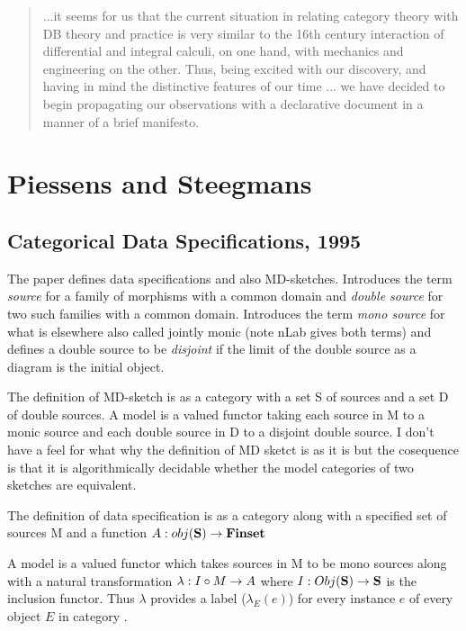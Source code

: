 \documentclass[10pt,a4paper]{scrartcl}
\begin{document}
\begin{quote}
...it seems for us that
the current situation in relating category theory with DB theory and practice is very similar to the 16th
century interaction of differential and integral calculi, on one hand, with mechanics and engineering on
the other. Thus, being excited with our discovery, and having in mind the distinctive features of our time
... we have decided to begin propagating our observations with a declarative document in
a manner of a brief manifesto.
\end{quote}

\section {Piessens and Steegmans}
\subsection{Categorical Data Specifications, 1995}
The paper \cite{piessens1995} defines data specifications and also MD-sketches.
Introduces the term \textit{source} for a family of morphisms with a common domain and \textit{double source} for two such families with a common domain.
Introduces the term \textit{mono source} 	for what is elsewhere also called jointly monic (note nLab gives both terms) and defines a double source to be \textit{disjoint} if the limit of the double source as a diagram is the initial object.

The definition of MD-sketch is as a  category with a set S of sources and a set D of double sources. A model is a  valued functor taking each source in M to a monic source and each double source in D to a disjoint double source. 
I don't have a feel for what why the definition of MD sketct is as it is but the cosequence is that it is algorithmically decidable whether the model categories of two sketches are equivalent. 



The definition of data specification is as a category  along with a specified set of sources M and a function $A: obj(\textbf{S}) \rightarrow \textbf{Finset}$

A model is a  valued functor which takes sources in M to be mono sources along with a natural transformation $\lambda : I \circ M \rightarrow A$ where $I:Obj(\textbf{S}) \rightarrow \textbf{S}$ is the inclusion functor. Thus $\lambda$ provides a label ($\lambda_E(e)$) for every instance
$e$ of every object $E$ in category .
\end{document}
